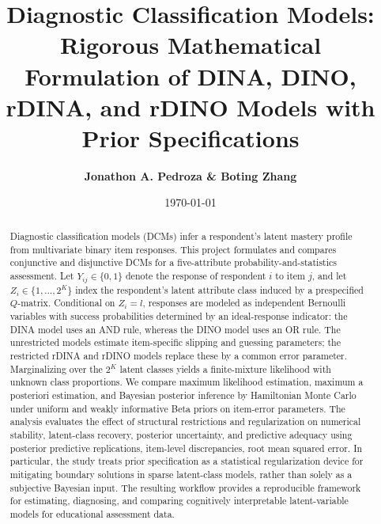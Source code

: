 \documentclass{scrartcl}
\begin{document}
\title{\textbf{Diagnostic Classification Models: Rigorous Mathematical 
Formulation of DINA, DINO, rDINA, and rDINO Models 
with Prior Specifications}}
\author{\textbf{Jonathon A. Pedroza \& Boting Zhang}}
\date{\today}

\maketitle


\begin{abstract}
Diagnostic classification models (DCMs) infer a respondent's latent mastery profile from 
multivariate binary item responses. This project formulates and compares conjunctive and 
disjunctive DCMs for a five-attribute probability-and-statistics assessment. 
Let $Y_{ij}\in\{0,1\}$ denote the response of respondent $i$ to item $j$, and 
let $Z_i\in\{1,\ldots,2^K\}$ index the respondent's latent attribute class induced 
by a prespecified $Q$-matrix. Conditional on $Z_i=l$, responses are modeled as independent 
Bernoulli variables with success probabilities determined by an ideal-response indicator: 
the DINA model uses an AND rule, whereas the DINO model uses an OR rule. The unrestricted 
models estimate item-specific slipping and guessing parameters; the restricted rDINA and 
rDINO models replace these by a common error parameter. Marginalizing over the $2^K$ latent 
classes yields a finite-mixture likelihood with unknown class proportions. We compare 
maximum likelihood estimation, maximum a posteriori estimation, and Bayesian posterior 
inference by Hamiltonian Monte Carlo under uniform and weakly informative Beta priors on 
item-error parameters. The analysis evaluates the effect of structural restrictions and 
regularization on numerical stability, latent-class recovery, posterior uncertainty, 
and predictive adequacy using posterior predictive replications, item-level discrepancies, 
root mean squared error. In particular, the study treats 
prior specification as a statistical regularization device for mitigating boundary 
solutions in sparse latent-class models, rather than solely as a subjective Bayesian input. 
The resulting workflow provides a reproducible framework for estimating, diagnosing, and 
comparing cognitively interpretable latent-variable models for educational assessment data.
\end{abstract}
\end{document}
